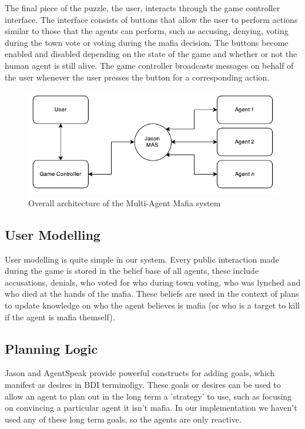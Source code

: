 \documentclass[12pt]{article} %
\begin{document}
The final piece of the puzzle, the user, interacts through the game controller interface. The interface consists of buttons that allow the user to perform actions similar to those that the agents can perform, such as accusing, denying, voting during the town vote or voting during the mafia decision. The buttons become enabled and disabled depending on the state of the game and whether or not the human agent is still alive. The game controller broadcasts messages on behalf of the user whenever the user presses the button for a corresponding action.

\begin{figure}
	\centering
	\includegraphics[width=\linewidth]{Overall.pdf}
	\caption{Overall architecture of the Multi-Agent Mafia system}
	\label{fig:overallarch}
\end{figure}

\subsection{User Modelling}

User modelling is quite simple in our system. Every public interaction made during the game is stored in the belief base of all agents, these include accusations, denials, who voted for who during town voting, who was lynched and who died at the hands of the mafia. These beliefs are used in the context of plans to update knowledge on who the agent believes is mafia (or who is a target to kill if the agent is mafia themself).


\subsection{Planning Logic}

Jason and AgentSpeak provide powerful constructs for adding goals, which manifest as desires in BDI terminoligy. These goals or desires can be used to allow an agent to plan out in the long term a 'strategy' to use, such as focusing on convincing a particular agent it isn't mafia. In our implementation we haven't used any of these long term goals, so the agents are only reactive.
\end{document}
